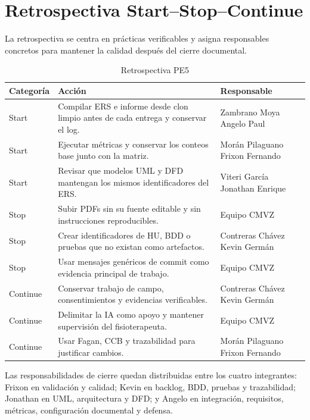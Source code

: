\documentclass[12pt,a4paper]{article}
\begin{document}
\section{Retrospectiva Start–Stop–Continue}
La retrospectiva se centra en prácticas verificables y asigna responsables concretos para mantener la calidad después del cierre documental.

\begin{table}[H]\centering\caption{Retrospectiva PE5}\begin{tabularx}{\textwidth}{p{}X p{}}\toprule
\textbf{Categoría}&\textbf{Acción}&\textbf{Responsable}\\\midrule
Start&Compilar ERS e informe desde clon limpio antes de cada entrega y conservar el log.&Zambrano Moya Angelo Paul\\
Start&Ejecutar métricas y conservar los conteos base junto con la matriz.&Morán Pilaguano Frixon Fernando\\
Start&Revisar que modelos UML y DFD mantengan los mismos identificadores del ERS.&Viteri García Jonathan Enrique\\
Stop&Subir PDFs sin su fuente editable y sin instrucciones reproducibles.&Equipo CMVZ\\
Stop&Crear identificadores de HU, BDD o pruebas que no existan como artefactos.&Contreras Chávez Kevin Germán\\
Stop&Usar mensajes genéricos de commit como evidencia principal de trabajo.&Equipo CMVZ\\
Continue&Conservar trabajo de campo, consentimientos y evidencias verificables.&Contreras Chávez Kevin Germán\\
Continue&Delimitar la IA como apoyo y mantener supervisión del fisioterapeuta.&Equipo CMVZ\\
Continue&Usar Fagan, CCB y trazabilidad para justificar cambios.&Morán Pilaguano Frixon Fernando\\\bottomrule
\end{tabularx}\end{table}

Las responsabilidades de cierre quedan distribuidas entre los cuatro integrantes: Frixon en validación y calidad; Kevin en backlog, BDD, pruebas y trazabilidad; Jonathan en UML, arquitectura y DFD; y Angelo en integración, requisitos, métricas, configuración documental y defensa.
\end{document}
